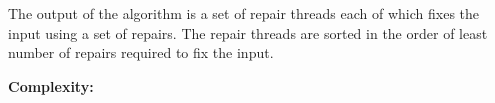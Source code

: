 \documentclass[sigconf,review,anonymous]{acmart}
\makeatletter
\newcounter{todocounter}
\newcommand{\todo}[1]{\marginpar{$|$}\textcolor{red}{\stepcounter{todocounter}\footnote[\thetodocounter]{\textcolor{red}{\textbf{TODO }}\textit{#1}}}}
\renewcommand{\todo}[1]{}
\newcommand{\approach}{\textsc{BRepair}\xspace}
\newcommand{\ddmax}{\textit{DDMax}\xspace}
\newcommand\letterboxed[1]{%
\setlength{\fboxsep}{0pt}%
  \@tfor\@ii:=#1\do{%
    \fcolorbox{white}{light-gray}{\texttt{\strut\@ii}}%
  }%
}
\makeatother
\begin{document}
The output of the algorithm is a set of repair threads each of which fixes the
input using a set of repairs. The repair threads are sorted in the order of
least number of repairs required to fix the input.

\noindent
\textbf{Complexity:}\todo{what is the space/time complexity of the \approach, and how does this compare to that of \ddmax. }


%

%
\end{document}
